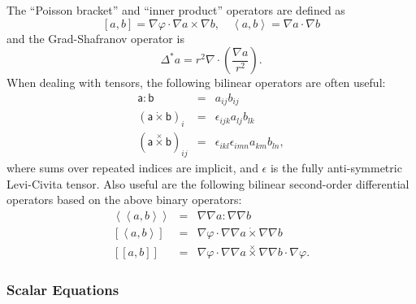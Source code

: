 \documentclass[letterpaper]{book}
\newcommand{\tensor}[1]{\mathsf{#1}}
\newcommand{\tor}{\varphi}              %
\newcommand{\grad}[1]{\nabla #1}
\renewcommand{\div}[1]{\nabla \cdot #1}
\newcommand{\dotdot}{:}
\newcommand{\dottimes}{\dot\times}
\newcommand{\timestimes}{\stackrel{\times}{\times}}
\newcommand{\gs}[1]{\Delta^* #1}
\newcommand{\pb}[2]{\left[#1,#2\right]}
\newcommand{\ip}[2]{\left\langle  #1,#2\right\rangle}
\newcommand{\funcss}[2]{
  \left\langle\left\langle #1,#2 \right\rangle\right\rangle}
\newcommand{\funcsa}[2]{\left[\left\langle #1,#2 \right\rangle\right]}
\newcommand{\funcaa}[2]{\left[\left[ #1,#2 \right]\right]}
\begin{document}
The ``Poisson bracket'' and ``inner product'' operators
are defined as
\[ 
\pb{a}{b} = \nabla \tor \cdot \grad{a} \times \grad{b}, 
\quad
\ip{a}{b} = \grad{a} \cdot \grad{b}
\]
and the Grad-Shafranov operator is
\[
\gs{a} = r^2 \div{\left(\frac{\grad{a}}{r^2}\right)}.
\]
When dealing with tensors, the following bilinear operators are often
useful:
\begin{eqnarray*}
  \tensor{a} \dotdot \tensor{b} & = & a_{i j} b_{i j}
  \\
  (\tensor{a} \dottimes \tensor{b})_i & = & \epsilon_{i j k}
  a_{l j} b_{l k}
  \\
  (\tensor{a} \timestimes \tensor{b})_{i j} & = & 
  \epsilon_{i k l} \epsilon_{i m n} a_{k m} b_{l n},
\end{eqnarray*}
where sums over repeated indices are implicit, and $\tensor{\epsilon}$
is the fully anti-symmetric Levi-Civita tensor.  Also useful are the
following bilinear second-order differential operators based on the
above binary operators:
\begin{eqnarray*}
  \funcss{a}{b} & = & \grad{\grad{a}} \dotdot \grad{\grad{b}} \\
  \funcsa{a}{b} & = & \grad{\tor} \cdot 
  \grad{\grad{a}} \dottimes \grad{\grad{b}}\\
  \funcaa{a}{b} & = & \grad{\tor} \cdot 
       \grad{\grad{a}} \timestimes \grad{\grad{b}}
       \cdot \grad{\tor}.
\end{eqnarray*}

\subsubsection{Scalar Equations}
\end{document}
